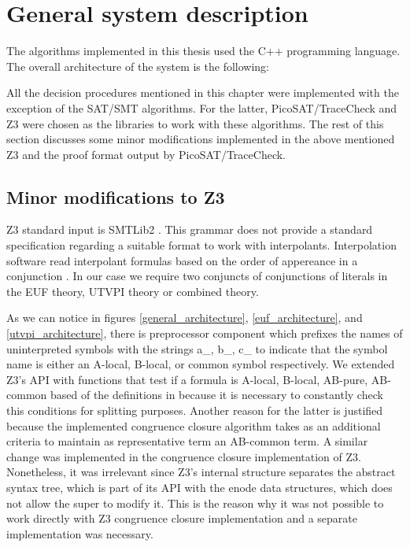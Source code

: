 \section{General system description}

The algorithms implemented in this thesis used the C++ programming
language. The overall architecture of the system is the following:





All the decision procedures mentioned in this chapter
were implemented with the exception of the SAT/SMT algorithms.
For the latter, PicoSAT/TraceCheck\cite{picosat08} and Z3 
\cite{10.1007/978-3-540-78800-3_24} were chosen as the 
libraries to work with these algorithms. 
The rest of this section discusses some minor modifications 
implemented in the above mentioned Z3 and the proof format 
output by PicoSAT/TraceCheck.

\subsection{Minor modifications to Z3}

Z3 standard input is SMTLib2 \cite{BarFT-SMTLIB}. This grammar
does not provide a standard specification regarding a suitable
format to work with interpolants. Interpolation software
read interpolant formulas based on the order of appereance
in a conjunction \cite{mcmillan2011interpolants}. In our case
we require two conjuncts of conjunctions of literals in the
EUF theory, UTVPI theory or combined theory. 

As we can notice in figures \ref{general_architecture}, \ref{euf_architecture},
and \ref{utvpi_architecture}, there is preprocessor component which prefixes
the names of uninterpreted symbols with the strings a\_, b\_, c\_
to indicate that the symbol name is either an A-local, B-local, or
common symbol respectively. We extended Z3's API with functions
that test if a formula is A-local, B-local, AB-pure, AB-common
based of the definitions in \cite{10.1007/11532231_26} because 
it is necessary to constantly check this conditions for splitting
purposes. Another reason for the latter is justified because the 
implemented congruence closure algorithm takes as an additional
criteria to maintain as representative term an AB-common term.
A similar change was implemented in the congruence closure implementation
of Z3. Nonetheless, it was irrelevant since Z3's internal structure
separates the abstract syntax tree, which is part of its API
with the enode data structures, which does not allow the super
to modify it. This is the reason why it was not
possible to work directly with Z3 congruence closure implementation
and a separate implementation was necessary.

